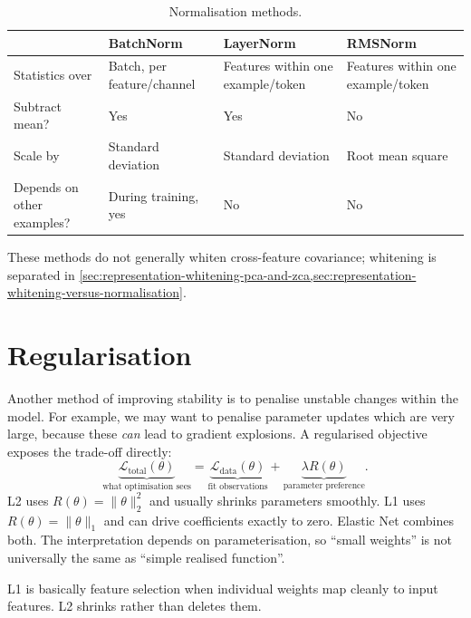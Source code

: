 \begin{table}[htbp]
    \centering
    \small
    \begin{tabularx}{\linewidth}{@{}L{.19\linewidth}YYY@{}}
    \toprule
     & BatchNorm & LayerNorm & RMSNorm \\
    \midrule
    Statistics over & Batch, per feature/channel & Features within one example/token & Features within one example/token \\
    Subtract mean? & Yes & Yes & No \\
    Scale by & Standard deviation & Standard deviation & Root mean square \\
    Depends on other examples? & During training, yes & No & No \\
    \bottomrule
    \end{tabularx}
    \caption{Normalisation methods.}
\end{table}

These methods do not generally whiten cross-feature covariance; whitening is separated in \cref{sec:representation-whitening-pca-and-zca,sec:representation-whitening-versus-normalisation}.

\section{Regularisation}
Another method of improving stability is to penalise unstable changes within the model. 
For example, we may want to penalise parameter updates which are very large, because these \textit{can} lead to gradient explosions.  
\label{sec:stability-regularisation-l1-and-l2}
A regularised objective exposes the trade-off directly:
\[
    \underbrace{\mathcal L_{\text{total}}(\theta)}_{\text{what optimisation sees}}
    =
    \underbrace{\mathcal L_{\text{data}}(\theta)}_{\text{fit observations}}
    +
    \underbrace{\lambda R(\theta)}_{\text{parameter preference}}.
\]
L2 uses $R(\theta)=\|\theta\|_2^2$ and usually shrinks parameters smoothly.
L1 uses $R(\theta)=\|\theta\|_1$ and can drive coefficients exactly to zero.
Elastic Net combines both.
The interpretation depends on parameterisation, so ``small weights'' is not universally the same as ``simple realised function''.

\begin{calloutintuition}
    L1 is basically feature selection when individual weights map cleanly to input features.
    L2 shrinks rather than deletes them.
\end{calloutintuition}

